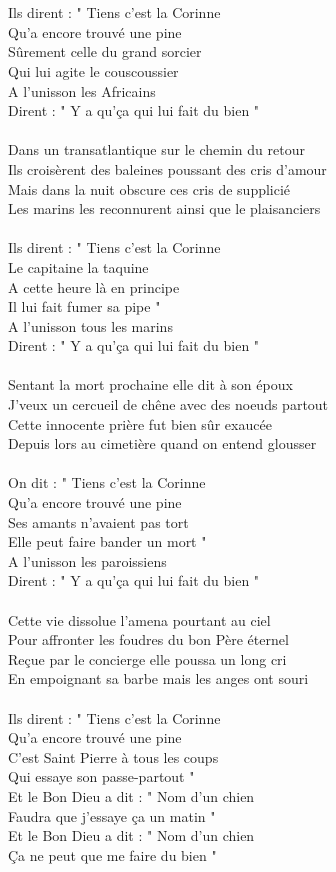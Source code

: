 \\\\Ils dirent : " Tiens c'est la Corinne
\\Qu'a encore trouvé une pine
\\Sûrement celle du grand sorcier
\\Qui lui agite le couscoussier
\\A l'unisson les Africains
\\Dirent : " Y a qu'ça qui lui fait du bien "
\\\\Dans un transatlantique sur le chemin du retour
\\Ils croisèrent des baleines poussant des cris d'amour
\\Mais dans la nuit obscure ces cris de supplicié
\\Les marins les reconnurent ainsi que le plaisanciers
\\\\Ils dirent : " Tiens c'est la Corinne
\\Le capitaine la taquine
\\A cette heure là en principe
\\Il lui fait fumer sa pipe "
\\A l'unisson tous les marins
\\Dirent : " Y a qu'ça qui lui fait du bien "
\\\\Sentant la mort prochaine elle dit à son époux
\\J'veux un cercueil de chêne avec des noeuds partout
\\Cette innocente prière fut bien sûr exaucée
\\Depuis lors au cimetière quand on entend glousser
\\\\On dit : " Tiens c'est la Corinne
\\Qu'a encore trouvé une pine
\\Ses amants n'avaient pas tort
\\Elle peut faire bander un mort "
\\A l'unisson les paroissiens
\\Dirent : " Y a qu'ça qui lui fait du bien "
\\\\Cette vie dissolue l'amena pourtant au ciel
\\Pour affronter les foudres du bon Père éternel
\\Reçue par le concierge elle poussa un long cri
\\En empoignant sa barbe mais les anges ont souri
\\\\Ils dirent : " Tiens c'est la Corinne
\\Qu'a encore trouvé une pine
\\C'est Saint Pierre à tous les coups
\\Qui essaye son passe-partout "
\\Et le Bon Dieu a dit : " Nom d'un chien
\\Faudra que j'essaye ça un matin "
\\Et le Bon Dieu a dit : " Nom d'un chien
\\Ça ne peut que me faire du bien "

\breakpage